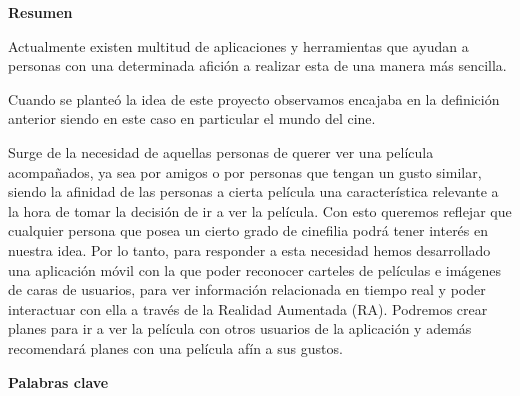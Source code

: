 
\newpage

\thispagestyle{empty}

\begin{center}

{\bf \Huge Resumen}

  \end{center}
\vspace{1cm}

Actualmente existen multitud de aplicaciones y herramientas que ayudan a
 personas con una determinada afición a realizar esta de una manera más sencilla.

Cuando se planteó la idea de este proyecto observamos encajaba en la definición
 anterior siendo en este caso en particular el mundo del cine.

Surge de la necesidad de aquellas personas de querer ver una película acompañados, 
ya sea por amigos o por personas que tengan un gusto similar, 
siendo la afinidad de las personas a cierta película una característica relevante a 
la hora de tomar la decisión de ir a ver la película. Con esto queremos reflejar que 
cualquier persona que posea un cierto grado de cinefilia podrá tener interés en nuestra 
idea.
Por lo tanto, para responder a esta necesidad hemos desarrollado una aplicación móvil 
con la que poder reconocer carteles de películas e imágenes de caras de usuarios, para 
ver información relacionada en tiempo real y poder interactuar con ella a 
través de la Realidad Aumentada (RA). Podremos crear planes para ir a ver la película con otros 
usuarios de la aplicación y además recomendará planes con una película afín a sus gustos.

\vspace{1cm}


\begin{center}

{\bf \Large Palabras clave}

   \end{center}

   \vspace{0.5cm}
   
